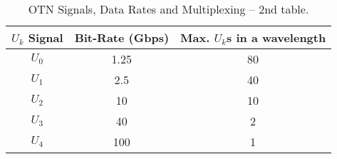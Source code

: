 \begin{table}[!t]
\renewcommand{\arraystretch}{1.1}
\caption{OTN Signals, Data Rates and Multiplexing -- 2nd table.}
\label{tab:otn2}
\centering
\begin{tabular}{c|c|c}
\hline
$U_{k}$ \textbf{Signal} &  Bit-Rate (Gbps) & Max. $U_{k}$s in a wavelength\\
\hline
$U_{0}$ & 1.25  & 80 \\
$U_{1}$ & 2.5  & 40 \\
$U_{2}$ & 10 & 10\\
$U_{3}$ & 40 & 2\\
$U_{4}$ & 100 & 1\\
\hline
\end{tabular}
\end{table}

